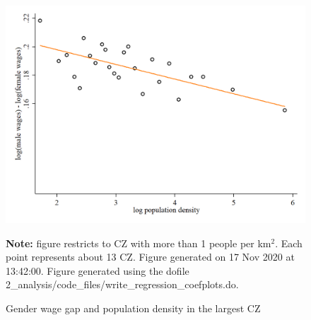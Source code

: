 \begin{figure}[!h]
\centering
\caption{Gender wage gap and population density in the largest CZ}
\includegraphics[width=1\textwidth]{../2_analysis/output/figures/l_czone_density_2020_big_CZ}
\par \begin{minipage}[h]{\textwidth}{\tiny\textbf{Note:} figure restricts to CZ with more than 1 people per km$^2$. Each point represents about 13 CZ. Figure generated on 17 Nov 2020 at 13:42:00. Figure generated using the dofile 2\_analysis/code\_files/write\_regression\_coefplots.do.}\end{minipage}
\end{figure}
